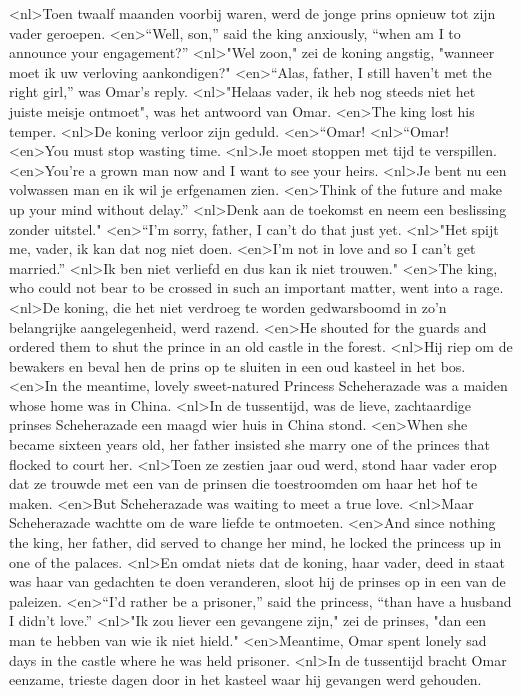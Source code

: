 <nl>Toen twaalf maanden voorbij waren, werd de jonge prins opnieuw tot zijn vader geroepen.
<en>“Well, son,” said the king anxiously, “when am I to announce your engagement?”
<nl>"Wel zoon," zei de koning angstig, "wanneer moet ik uw verloving aankondigen?"
<en>“Alas, father, I still haven’t met the right girl,” was Omar’s reply.
<nl>"Helaas vader, ik heb nog steeds niet het juiste meisje ontmoet", was het antwoord van Omar.
<en>The king lost his temper.
<nl>De koning verloor zijn geduld.
<en>“Omar!
<nl>“Omar!
<en>You must stop wasting time.
<nl>Je moet stoppen met tijd te verspillen.
<en>You’re a grown man now and I want to see your heirs.
<nl>Je bent nu een volwassen man en ik wil je erfgenamen zien.
<en>Think of the future and make up your mind without delay.”
<nl>Denk aan de toekomst en neem  een beslissing zonder uitstel."
<en>“I’m sorry, father, I can’t do that just yet.
<nl>"Het spijt me, vader, ik kan dat nog niet doen.
<en>I’m not in love and so I can’t get married.” 
<nl>Ik ben niet verliefd en dus kan ik niet trouwen." 
<en>The king, who could not bear to be crossed in such an important matter, went into a rage.
<nl>De koning, die het niet verdroeg  te worden gedwarsboomd in zo'n belangrijke aangelegenheid, werd razend.
<en>He shouted for the guards and ordered them to shut the prince in an old castle in the forest.
<nl>Hij riep om de bewakers en beval hen de prins op te sluiten in een oud kasteel in het bos.
<en>In the meantime, lovely sweet-natured Princess Scheherazade was a maiden whose home was in China.
<nl>In de tussentijd, was de lieve, zachtaardige prinses Scheherazade een maagd wier huis in China stond.
<en>When she became sixteen years old, her father insisted she marry one of the princes that flocked to court her.
<nl>Toen ze zestien jaar oud werd, stond haar vader erop dat ze trouwde met een van de prinsen die toestroomden om  haar het hof te maken.
<en>But Scheherazade was waiting to meet a true love.
<nl>Maar Scheherazade wachtte om de ware liefde te ontmoeten.
<en>And since nothing the king, her father, did served to change her mind, he locked the princess up in one of the palaces.
<nl>En omdat niets dat de koning, haar vader, deed  in staat was haar van gedachten te doen veranderen, sloot hij de prinses op in een van de paleizen.
<en>“I’d rather be a prisoner,” said the princess, “than have a husband I didn’t love.”
<nl>"Ik zou liever een gevangene zijn," zei de prinses, "dan een man te hebben van wie ik niet hield."
<en>Meantime, Omar spent lonely sad days in the castle where he was held prisoner.
<nl>In de tussentijd bracht Omar eenzame, trieste dagen door in het kasteel waar hij gevangen werd gehouden.
